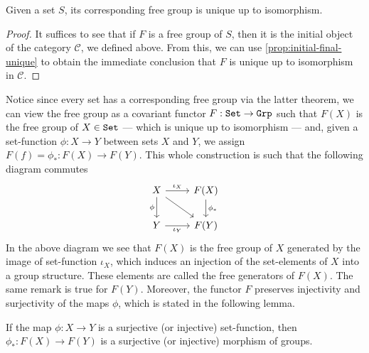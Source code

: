 \begin{corollary}\label{cor:free-group-unique-iso}
    Given a set \(S\), its corresponding free group is unique up to isomorphism.
\end{corollary}

\begin{proof}
    It suffices to see that if \(F\) is a free group of \(S\), then it is the
    initial object of the category \(\mathcal C\), we defined above. From this, we
    can use \cref{prop:initial-final-unique} to obtain the immediate conclusion that
    \(F\) is unique up to isomorphism in \(\mathcal C\).
\end{proof}


Notice since every set has a corresponding free group via the latter theorem, we
can view the free group as a covariant functor \(F: {\texttt{Set}} \to {\texttt{Grp}}\) such that
\(F(X)\) is the free group of \(X \in {\texttt{Set}}\) --- which is unique up to
isomorphism --- and, given a set-function \(\phi: X \to Y\) between sets \(X\)
and \(Y\), we assign \(F(f) = \phi_{*}: F(X) \to F(Y)\). This whole construction
is such that the following diagram commutes
\begin{equation}\label{eq:free-functor}
    \begin{tikzcd}
        X \ar[r, "\iota_X"] \ar[d, swap, "\phi"] \ar[dr]
        &F(X) \ar[d, "\phi_{*}"] \\
        Y \ar[r, swap, "\iota_Y"] &F(Y)
    \end{tikzcd}
\end{equation}
In the above diagram we see that \(F(X)\) is the free group of \(X\) generated
by the image of set-function \(\iota_X\), which induces an injection of the
set-elements of \(X\) into a group structure. These elements are called the free
generators of \(F(X)\). The same remark is true for \(F(Y)\). Moreover, the
functor \(F\) preserves injectivity and surjectivity of the maps \(\phi\), which
is stated in the following lemma.

\begin{lemma}\label{lem:free-func-preserves-inj-sur}
    If the map \(\phi: X \to Y\) is a surjective (or injective) set-function, then
    \(\phi_{*}: F(X) \to F(Y)\) is a surjective (or injective) morphism of groups.
\end{lemma}

